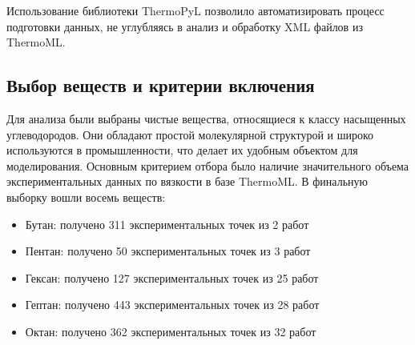 \documentclass[a4paper,12pt]{article}
\begin{document}
      Использование библиотеки ThermoPyL позволило автоматизировать процесс подготовки данных, не углубляясь в анализ и обработку XML файлов из ThermoML.
    
  \subsection{Выбор веществ и критерии включения}
  
  Для анализа были выбраны чистые вещества, относящиеся к классу насыщенных углеводородов. Они обладают простой молекулярной структурой и широко используются в промышленности, что делает их удобным объектом для моделирования. Основным критерием отбора было наличие значительного объема экспериментальных данных по вязкости в базе ThermoML. В финальную выборку вошли восемь веществ:
    \begin{itemize}
      \item Бутан: получено 311 экспериментальных точек из 2 работ \cite{acs.jced.5b00654,s10765-006-0053-2}
      \item Пентан: получено 50 экспериментальных точек из 3 работ \cite{acs.jced.7b00650,j.jct.2005.10.011,je0501944}
      \item Гексан: получено 127 экспериментальных точек из 25 работ \cite{acs.jced.5b00152,acs.jced.8b00589,j.fluid.2013.07.060,j.fluid.2018.08.001,j.jct.2004.09.021,j.jct.2005.03.024,j.jct.2005.07.008,j.jct.2005.10.011,j.jct.2007.05.016,j.jct.2008.02.005,j.tca.2005.10.008,je020114l,je020131a,je030107c,je034002l,je049576k,je049777o,je060389r,je060491o,je800048f,je8006138,je9006597,s10765-005-5572-8,s10765-006-0053-2,s10765-009-0622-2}
      \item Гептан: получено 443 экспериментальных точек из 28 работ \cite{acs.jced.5b00152,acs.jced.7b00121,j.fluid.2006.01.030,j.fluid.2010.10.009,j.fluid.2016.11.029,j.jct.2004.09.021,j.jct.2005.03.024,j.jct.2005.10.011,j.jct.2006.01.012,j.jct.2013.09.017,j.jct.2015.12.021,j.tca.2005.10.008,j.tca.2015.08.005,j.tca.2018.10.018,je020131a,je049662k,je049776w,je049777o,je400835u,je5007532,je600554h,je700202h,je8003707,je9006597,je900969u,s10765-009-0667-2,s10765-012-1373-z,s10765-014-1759-1}
      \item Октан: получено 362 экспериментальных точек из 32 работ \cite{acs.jced.6b00391,acs.jced.7b00121,acs.jced.7b00650,j.fluid.2010.10.009,j.jct.2003.12.005,j.jct.2004.09.021,j.jct.2005.03.024,j.jct.2005.10.011,j.jct.2006.01.012,j.jct.2007.05.016,j.jct.2008.02.005,j.jct.2013.09.017,j.jct.2014.09.015,j.tca.2005.10.008,j.tca.2015.08.005,je020131a,je034017j,je034208m,je049572f,je049776w,je0503296,je060389r,je300899n,je4004806,je400835u,je600554h,je800348s,je800417q,je9006597,s10765-006-0053-2,s10765-008-0542-6,s10765-014-1759-1}

\end{itemize}
\end{document}
